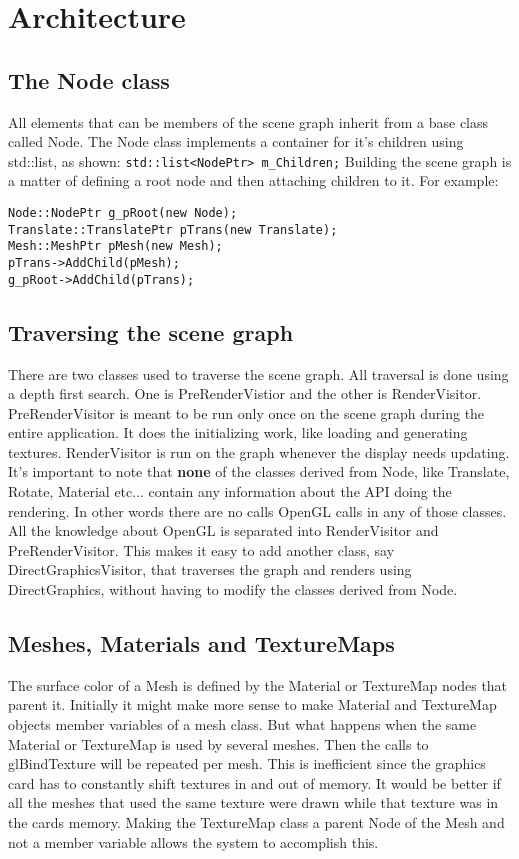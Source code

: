 \documentclass{article}
\begin{document}
\section{Architecture}
\subsection{The Node class}
All elements that can be members of the scene graph inherit from a base class
called Node. The Node class implements a container for it's children using
std::list, as shown:
\newline
\verb|std::list<NodePtr> m_Children;|
\newline
Building the scene graph is a matter of defining a root node and then attaching
children to it. For example:
\begin{verbatim}
Node::NodePtr g_pRoot(new Node);
Translate::TranslatePtr pTrans(new Translate);
Mesh::MeshPtr pMesh(new Mesh);
pTrans->AddChild(pMesh);
g_pRoot->AddChild(pTrans);	
\end{verbatim}
\subsection{Traversing the scene graph}
There are two classes used to traverse the scene graph. All traversal is done
using a depth first search. One is PreRenderVistior and the other is
RenderVisitor. PreRenderVisitor is meant to be run only once on the scene graph
during the entire application. It does the initializing work, like loading and
generating textures. RenderVisitor is run on the graph whenever the display
needs updating. It's important to note that \textbf{none} of the classes derived from
Node, like Translate, Rotate, Material etc... contain any information about the
API doing the rendering. In other words there are no calls OpenGL calls in any
of those classes. All the knowledge about OpenGL is separated into RenderVisitor
and PreRenderVisitor. This makes it easy to add another class, say
DirectGraphicsVisitor, that traverses the graph and renders using
DirectGraphics, without having to modify the classes derived from Node.
\subsection{Meshes, Materials and TextureMaps}
The surface color of a Mesh is defined by the Material or TextureMap nodes that
parent it. Initially it might make more sense to make Material and TextureMap
objects member variables of a mesh class. But what happens when the same
Material or TextureMap is used by several meshes. Then the calls to
glBindTexture will be repeated per mesh. This is inefficient since the graphics
card has to constantly shift textures in and out of memory. It would be better
if all the meshes that used the same texture were drawn while that texture was
in the cards memory. Making the TextureMap class a parent Node of the Mesh and
not a member variable allows the system to accomplish this.
\end{document}
